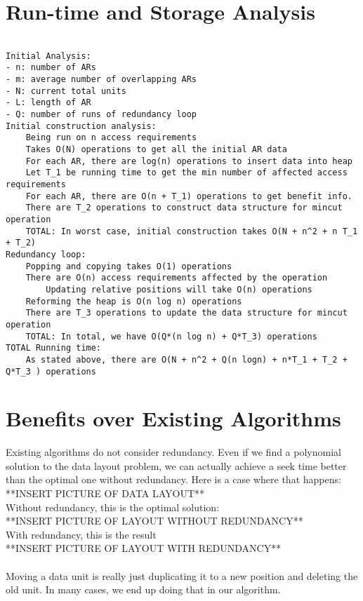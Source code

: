 \documentclass[11pt,psfig]{article}
\begin{document}
\section*{Run-time and Storage Analysis}

\begin{verbatim}

Initial Analysis:
- n: number of ARs
- m: average number of overlapping ARs
- N: current total units
- L: length of AR
- Q: number of runs of redundancy loop
Initial construction analysis:
	Being run on n access requirements
	Takes O(N) operations to get all the initial AR data
	For each AR, there are log(n) operations to insert data into heap
	Let T_1 be running time to get the min number of affected access requirements
	For each AR, there are O(n + T_1) operations to get benefit info.
	There are T_2 operations to construct data structure for mincut operation
	TOTAL: In worst case, initial construction takes O(N + n^2 + n T_1 + T_2)
Redundancy loop:
	Popping and copying takes O(1) operations
	There are O(n) access requirements affected by the operation
		Updating relative positions will take O(n) operations
	Reforming the heap is O(n log n) operations
	There are T_3 operations to update the data structure for mincut operation
	TOTAL: In total, we have O(Q*(n log n) + Q*T_3) operations
TOTAL Running time:
	As stated above, there are O(N + n^2 + Q(n logn) + n*T_1 + T_2 + Q*T_3 ) operations

\end{verbatim}

\section*{Benefits over Existing Algorithms}

Existing algorithms do not consider redundancy. Even if we find a polynomial solution to the data layout problem, we can actually achieve a seek time better than the optimal one without redundancy. Here is a case where that happens:\\
**INSERT PICTURE OF DATA LAYOUT**\\
Without redundancy, this is the optimal solution:\\
**INSERT PICTURE OF LAYOUT WITHOUT REDUNDANCY**\\
With redundancy, this is the result\\
**INSERT PICTURE OF LAYOUT WITH REDUNDANCY**\\
\\
Moving a data unit is really just duplicating it to a new position and deleting the old unit. In many cases, we end up doing that in our algorithm. 
\end{document}
